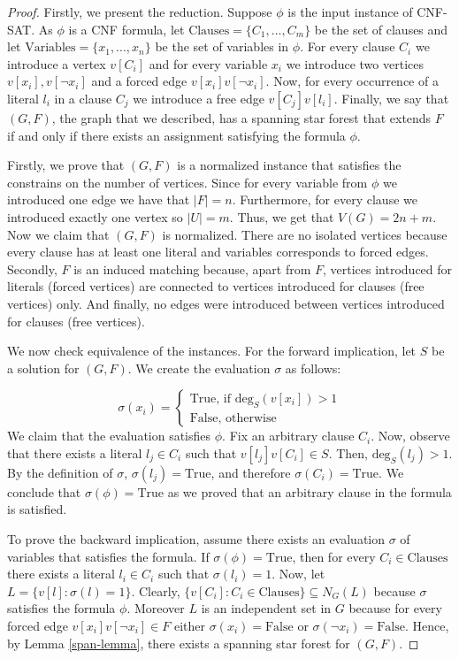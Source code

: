 \documentclass[en]{pracamgr}
\theoremstyle{definition}
\newcommand{\cnfsat}{{\sc CNF-SAT}}
\newcommand{\degree}[2]{\textrm{deg}_{#1}(#2)}
\newcommand{\true}{\textrm{True}}
\newcommand{\false}{\textrm{False}}
\begin{document}
\begin{proof}
	Firstly, we present the reduction. Suppose $\phi$ is the input instance of \cnfsat{}. As $\phi$ is a CNF formula, let $\textrm{Clauses}=\{C_1,...,C_m\}$ be the set of clauses and let $\textrm{Variables}=\{x_1,...,x_n\}$ be the set of variables in $\phi$. For every clause $C_i$ we introduce a vertex $v[C_i]$ and for every variable $x_i$ we introduce two vertices $v[x_i],v[\neg x_i]$ and a forced edge $v[x_i]v[\neg x_i]$. Now, for every occurrence of a literal $l_i$ in a clause $C_j$ we introduce a free edge $v[C_j]v[l_i]$. Finally, we say that $(G,F)$, the graph that we described, has a spanning star forest that extends $F$ if and only if there exists an assignment satisfying the formula $\phi$.
	
	Firstly, we prove that $(G,F)$ is a normalized instance that satisfies the constrains on the number of vertices. Since for every variable from $\phi$ we introduced one edge we have that $|F|=n$. Furthermore, for every clause we introduced exactly one vertex so $|U|=m$. Thus, we get that $V(G) = 2n+m$.
	Now we claim that $(G,F)$ is normalized. There are no isolated vertices because every clause has at least one literal and variables corresponds to forced edges. Secondly, $F$ is an induced matching because, apart from $F$, vertices introduced for literals (forced vertices) are connected to vertices introduced for clauses (free vertices) only. And finally, no edges were introduced between vertices introduced for clauses (free vertices).
	
	We now check equivalence of the instances. For the forward implication, let $S$ be a solution for $(G,F)$. We create the evaluation $\sigma$ as follows:
	
	\begin{equation*}
		\sigma(x_i) = 
		\begin{cases}
			\textrm{True}\text{, if $\degree{S}{v[x_i]} > 1$} \\
			\textrm{False}\text{, otherwise}
		\end{cases}
	\end{equation*}
	We claim that the evaluation satisfies $\phi$. Fix an arbitrary clause $C_i$. Now, observe that there exists a literal $l_j \in C_i$ such that $v[l_j]v[C_i] \in S$. Then, $\degree{S}{l_j}>1$. By the definition of $\sigma$, $\sigma(l_j)=\true$, and therefore $\sigma(C_i)=\true$. We conclude that $\sigma(\phi)=\true$ as we proved that an arbitrary clause in the formula is satisfied.
	
	To prove the backward implication, assume there exists an evaluation $\sigma$ of variables that satisfies the formula. If $\sigma(\phi)=\textrm{True}$, then for every $C_i \in \textrm{Clauses}$ there exists a literal $l_i \in C_i$ such that $\sigma(l_i)=1$. Now, let $L = \{v[l]: \sigma(l)=1\}$. Clearly, $\{v[C_i]: C_i \in \textrm{Clauses}\} \subseteq N_G(L)$ because $\sigma$ satisfies the formula $\phi$. Moreover $L$ is an independent set in $G$ because for every forced edge $v[x_i]v[\neg x_i] \in F$ either $\sigma(x_i)=\false$ or $\sigma(\neg x_i)=\false$. Hence, by Lemma \ref{span-lemma}, there exists a spanning star forest for $(G,F)$.
\end{proof}
\end{document}
